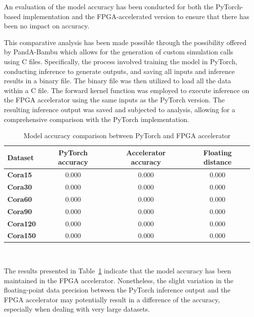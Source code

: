 An evaluation of the model accuracy has been conducted for both the PyTorch-based implementation and the FPGA-accelerated version to ensure that there has been no impact on accuracy.

This comparative analysis has been made possible through the possibility offered by PandA-Bambu which allows for the generation of custom simulation calls using C files.
Specifically, the process involved training the model in PyTorch, conducting inference to generate outputs, and saving all inputs and inference results in a binary file.
The binary file was then utilized to load all the data within a C file.
The forward kernel function was employed to execute inference on the FPGA accelerator using the same inputs as the PyTorch version.
The resulting inference output was saved and subjected to analysis, allowing for a comprehensive comparison with the PyTorch implementation.

\begin{table}[t]
\centering
    \begin{tabular}{|p{5em} c c c|}
    \hline
    \textbf{Dataset} & \textbf{PyTorch accuracy} & \textbf{Accelerator accuracy} & \textbf{Floating distance} \T\B \\
    \hline \hline
    \textbf{Cora15} & 0.000 & 0.000 & 0.000 \T\B\\
    \hline
    \textbf{Cora30} & 0.000 & 0.000 & 0.000 \T\B\\
    \hline
    \textbf{Cora60} & 0.000 & 0.000 & 0.000 \T\B\\
    \hline
    \textbf{Cora90} & 0.000 & 0.000 & 0.000 \T\B\\
    \hline
    \textbf{Cora120} & 0.000 & 0.000 & 0.000 \T\B\\
    \hline
    \textbf{Cora150} & 0.000 & 0.000 & 0.000 \T\B\\
    \hline
    \end{tabular}
    \\[10pt]
    \caption{Model accuracy comparison between PyTorch and FPGA accelerator}
    \label{tab:model-accuracy-analysis}
\end{table}

The results presented in Table~\ref{tab:model-accuracy-analysis} indicate that the model accuracy has been maintained in the FPGA accelerator.
Nonetheless, the slight variation in the floating-point data precision between the PyTorch inference output and the FPGA accelerator may potentially result in a difference of the accuracy, especially when dealing with very large datasets.

